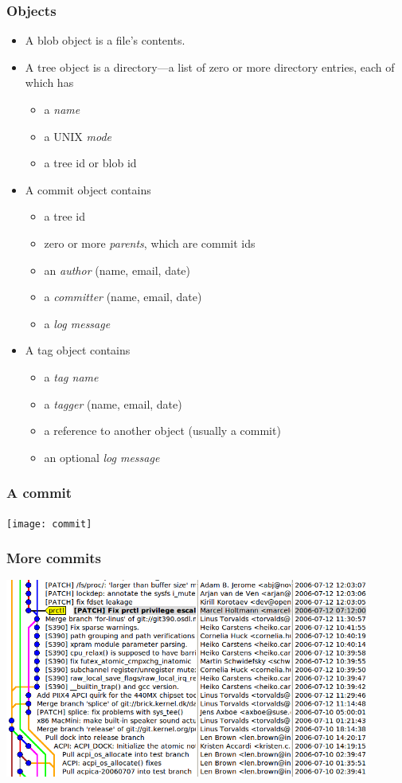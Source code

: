 \documentclass{beamer}
\begin{document}
\begin{frame}
  \frametitle{Objects}

  \begin{itemize}
  \item A blob object is a file's contents.
  \item A tree object is a directory---a list of zero or more
    directory entries, each of which has
    \begin{itemize}
    \item a \emph{name}
    \item a UNIX \emph{mode}
    \item a tree id or blob id
    \end{itemize}
  \item A commit object contains
    \begin{itemize}
    \item a tree id
    \item zero or more \emph{parents}, which are commit ids
    \item an \emph{author} (name, email, date)
    \item a \emph{committer} (name, email, date)
    \item a \emph{log message}
    \end{itemize}
  \item A tag object contains
    \begin{itemize}
    \item a \emph{tag name}
    \item a \emph{tagger} (name, email, date)
    \item a reference to another object (usually a commit)
    \item an optional \emph{log message}
    \end{itemize}
  \end{itemize}
\end{frame}

\begin{frame}
  \frametitle{A commit}
  \texttt{[image: commit]}
\end{frame}

\begin{frame}
  \frametitle{More commits}
  \includegraphics[width=12cm]{prctl}
\end{frame}
\end{document}
